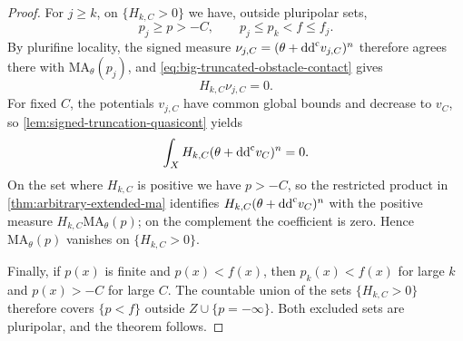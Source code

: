 \begin{proof}
For $j\geq k$, on $\{H_{k,C}>0\}$ we have, outside pluripolar sets,
\[
 p_j\geq p>-C,\qquad p_j\leq p_k<f\leq f_j.
\]
By plurifine locality, the signed measure $\nu_{j,C}=(\theta+\mathrm{dd}^{\mathrm{c}} v_{j,C})^n$ therefore agrees there with $\mathrm{MA}_\theta(p_j)$, and \eqref{eq:big-truncated-obstacle-contact} gives
\[
 H_{k,C}\nu_{j,C}=0.
\]
For fixed $C$, the potentials $v_{j,C}$ have common global bounds and decrease to $v_C$, so \cref{lem:signed-truncation-quasicont} yields
\[
 \int_X H_{k,C}(\theta+\mathrm{dd}^{\mathrm{c}} v_C)^n=0.
\]
On the set where $H_{k,C}$ is positive we have $p>-C$, so the restricted product in \cref{thm:arbitrary-extended-ma} identifies $H_{k,C}(\theta+\mathrm{dd}^{\mathrm{c}} v_C)^n$ with the positive measure $H_{k,C}\mathrm{MA}_\theta(p)$; on the complement the coefficient is zero. Hence $\mathrm{MA}_\theta(p)$ vanishes on $\{H_{k,C}>0\}$.

Finally, if $p(x)$ is finite and $p(x)<f(x)$, then $p_k(x)<f(x)$ for large $k$ and $p(x)>-C$ for large $C$. The countable union of the sets $\{H_{k,C}>0\}$ therefore covers $\{p<f\}$ outside $Z\cup\{p=-\infty\}$. Both excluded sets are pluripolar, and the theorem follows.
\end{proof}
